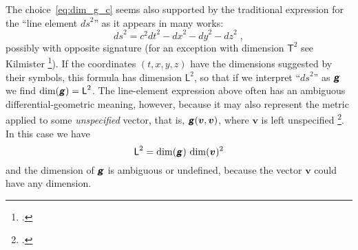 \documentclass[a4paper,12pt,onecolumn,oneside,article,british]{memoir}
\newcommand*{\mathte}[1]{\textbf{\textit{\textsf{#1}}}}
\newcommand*{\citep}{\footcites}
\newcommand*{\sect}{\S}%
\newcommand*{\chap}{ch.}%
\newcommand*{\cf}{{cf.}}
\newcommand*{\Le}{\textsf{L}}
\newcommand*{\Ti}{\textsf{T}}
\newcommand*{\yg}{\mathte{g}}
\newcommand*{\ygc}{\mathte{g}}
\newcommand*{\yv}{\bm{v}}
\newcommand*{\ds}{\mathit{ds}}
\begin{document}
The choice~\eqref{eq:dim_g_c} seems also supported by the traditional
expression for the \enquote{line element $\ds^{2}$} as it appears in many
works:
\begin{equation}
  \label{eq:line_elem}
  \ds^{2} = c^2\mathit{dt}^2 - \mathit{dx}^2 -\mathit{dy}^2 - \mathit{dz}^2
  \;,
\end{equation}
possibly with opposite signature (for an exception with dimension $\Ti^{2}$
see Kilmister \citep[\chap~II p.~25]{kilmister1973}{kilmister1973}). If the
coordinates $(t,x,y,z)$ have the dimensions suggested by their symbols,
this formula has dimension $\Le^{2}$, so that if we interpret
\enquote{$\ds^{2}$} as $\ygc$ we find $\dim(\ygc) = \Le^{2}$. The
line-element expression above often has an ambiguous differential-geometric
meaning, however, because it may also represent the metric applied to some
\emph{unspecified} vector, that is, $\yg(\yv,\yv)$, where $\yv$ is left
unspecified \citep[\cf][Box~3.2~D p.~77]{misneretal1970_r1973}. In this
case we have
\begin{equation}
  \label{eq:line_elem_dim_ambiguous}
  \Le^{2} = \dim(\yg)\,\dim(\yv)^{2}
\end{equation}
and the dimension of $\yg$ is ambiguous or undefined, because the vector
$\yv$ could have any dimension.%

\medskip
\end{document}
